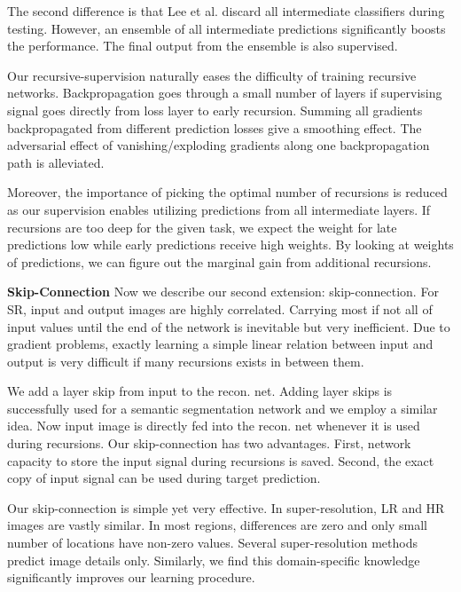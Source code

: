 \documentclass[10pt,twocolumn,letterpaper]{article}
\begin{document}
The second difference is that Lee et al. \cite{lee2014deeply} discard all intermediate classifiers during testing. However, an ensemble of all intermediate predictions significantly boosts the performance. The final output from the ensemble is also supervised.

Our recursive-supervision naturally eases the difficulty of training recursive networks. Backpropagation goes through a small number of layers if supervising signal goes directly from loss layer to early recursion. Summing all gradients backpropagated from different prediction losses give a smoothing effect. The adversarial effect of vanishing/exploding gradients along one backpropagation path is alleviated.

Moreover, the importance of picking the optimal number of recursions is reduced as our supervision enables utilizing predictions from all intermediate layers. If recursions are too deep for the given task, we expect the weight for late predictions low while early predictions receive high weights. By looking at weights of predictions, we can figure out the marginal gain from additional recursions. 

\textbf{Skip-Connection} Now we describe our second extension: skip-connection. For SR, input and output images are highly correlated. Carrying most if not all of input values until the end of the network is inevitable but very inefficient. Due to gradient problems, exactly learning a simple linear relation between input and output is very difficult if many recursions exists in between them.  

We add a layer skip \cite{bishop2006pattern} from input to the recon. net. Adding layer skips is successfully used for a semantic segmentation network \cite{long2014fully} and we employ a similar idea. Now input image is directly fed into the recon. net whenever it is used during recursions. Our skip-connection has two advantages. First, network capacity to store the input signal during recursions is saved. Second, the exact copy of input signal can be used during target prediction. 

Our skip-connection is simple yet very effective. In super-resolution, LR and HR images are vastly similar. In most regions, differences are zero and only small number of locations have non-zero values. Several super-resolution methods \cite{Timofte2013, Timofte, bevilacqua2012,bevilacqua2013super} predict image details only. Similarly, we find this domain-specific knowledge significantly improves our learning procedure. 
\end{document}
